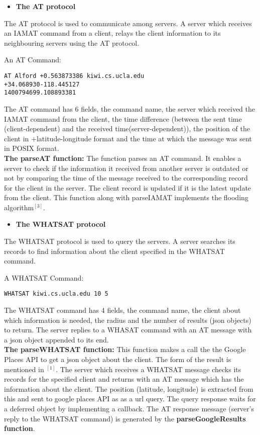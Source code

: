 \documentclass[letterpaper,twocolumn,10pt]{article}
\begin{document}
\begin{itemize}
\item \textbf{The AT protocol}
\end{itemize}
The AT protocol is used to communicate among servers. A server which receives an IAMAT command from a client, relays the client information to its neighbouring servers using the AT protocol.

An AT Command:
\begin{lstlisting}
AT Alford +0.563873386 kiwi.cs.ucla.edu 
+34.068930-118.445127 
1400794699.108893381
\end{lstlisting}

The AT command has 6 fields, the command name, the server which received the IAMAT command from the client, the time difference (between the sent time (client-dependent) and the received time(server-dependent)), the position of the client in +latitude-longitude format and the time at which the message was sent in POSIX format. 
\\
\textbf{The parseAT function:}
The function parses an AT command. It enables a server to check if the information it received from another server is outdated or not by comparing the time of the message received to the corresponding record for the client in the server. The client record is updated if it is the latest update from the client. This function along with parseIAMAT implements the flooding algorithm$^[3]$. 


\begin{itemize}
\item \textbf{The WHATSAT protocol}
\end{itemize}
The WHATSAT protocol is used to query the servers. A server searches its records to find information about the client specified in the WHATSAT command.

A WHATSAT Command:
\begin{lstlisting}
WHATSAT kiwi.cs.ucla.edu 10 5
\end{lstlisting}

The WHATSAT command has 4 fields, the command name, the client about which information is needed, the radius and the number of results (json objects) to return. 
The server replies to a WHASAT command with an AT message with a json object appended to its end.
\\
\textbf{The parseWHATSAT function:} This function makes a call the the Google Places API to get a json object about the client. The form of the result is mentioned in $^{[1]}$.
The server which receives a WHATSAT message checks its records for the specified client and returns with an AT message which has the information about the client. The position (latitude, longitude) is extracted from this and sent to google places API as as a url query. 	The query response waits for a deferred object by implementing a callback.
The AT response message (server's reply to the WHATSAT command) is generated by the \textbf{parseGoogleResults function}. 
\end{document}
